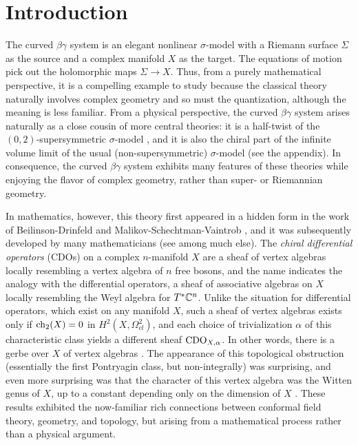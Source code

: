 \part*{Introduction}

The curved $\beta\gamma$ system is an elegant nonlinear $\sigma$-model with a Riemann surface $\Sigma$ as the source and a complex manifold $X$ as the target. The equations of motion pick out the holomorphic maps $\Sigma \to X$. Thus, from a purely mathematical perspective, it is a compelling example to study 
because the classical theory naturally involves complex geometry and so must the quantization, although the meaning is less familiar. From a physical perspective, the curved $\beta\gamma$ system arises naturally as a close cousin of more central theories: it is a half-twist of the $(0,2)$-supersymmetric $\sigma$-model \cite{WittenCDO}, and it is also the chiral part of the infinite volume limit of the usual (non-supersymmetric) $\sigma$-model (see the appendix). In consequence, the curved $\beta\gamma$ system exhibits many features of these theories while enjoying the flavor of complex geometry, rather than super- or Riemannian geometry.

In mathematics, however, this theory first appeared in a hidden form in the work of Beilinson-Drinfeld and Malikov-Schechtman-Vaintrob \cite{BD,MSV}, and it was subsequently developed by many mathematicians (see \cite{KV,Cheung,Bressler} among much else). The {\em chiral differential operators} (CDOs) on a complex $n$-manifold $X$ are a sheaf of vertex algebras locally resembling a vertex algebra of $n$ free bosons, and the name indicates the analogy with the differential operators, a sheaf of associative algebras on $X$ locally resembling the Weyl algebra for $T^*\mathbb C^n$. Unlike the situation for differential operators, which exist on any manifold $X$, such a sheaf of vertex algebras exists only if ${\rm ch}_2(X) = 0$ in $H^2(X, \Omega^2_{cl})$, and each choice of trivialization $\alpha$ of this characteristic class yields a different sheaf ${\rm CDO}_{X,\alpha}$. In other words, there is a gerbe over $X$ of vertex algebras \cite{GMS}. The appearance of this topological obstruction (essentially the first Pontryagin class, but non-integrally) was surprising, and even more surprising was that the character of this vertex algebra was the Witten genus of $X$, up to a constant depending only on the dimension of $X$ \cite{BorLib}. These results exhibited the now-familiar rich connections between conformal field theory, geometry, and topology, but arising from a mathematical process rather than a physical argument. 

